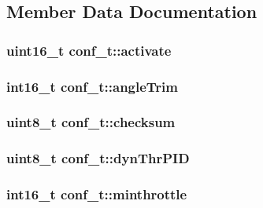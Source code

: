 \subsection{Member Data Documentation}
\hypertarget{structconf__t_a1442ab81807251b8fe263a6facf11ddb}{
\subsubsection[{activate}]{\setlength{\rightskip}{0pt plus 5cm}uint16\-\_\-t conf\-\_\-t\-::activate}}\label{structconf__t_a1442ab81807251b8fe263a6facf11ddb}
\hypertarget{structconf__t_ab122cdccc1b9b801849f925be1680054}{
\subsubsection[{angle\-Trim}]{\setlength{\rightskip}{0pt plus 5cm}int16\-\_\-t conf\-\_\-t\-::angle\-Trim}}\label{structconf__t_ab122cdccc1b9b801849f925be1680054}
\hypertarget{structconf__t_a9d2871d7decd958de75b19a372955045}{
\subsubsection[{checksum}]{\setlength{\rightskip}{0pt plus 5cm}uint8\-\_\-t conf\-\_\-t\-::checksum}}\label{structconf__t_a9d2871d7decd958de75b19a372955045}
\hypertarget{structconf__t_a47cb9553b60e167b09e7665b146c28db}{
\subsubsection[{dyn\-Thr\-P\-I\-D}]{\setlength{\rightskip}{0pt plus 5cm}uint8\-\_\-t conf\-\_\-t\-::dyn\-Thr\-P\-I\-D}}\label{structconf__t_a47cb9553b60e167b09e7665b146c28db}
\hypertarget{structconf__t_a38afc04bc65eb117eb45c9bc0c46d3c5}{
\subsubsection[{minthrottle}]{\setlength{\rightskip}{0pt plus 5cm}int16\-\_\-t conf\-\_\-t\-::minthrottle}}\label{structconf__t_a38afc04bc65eb117eb45c9bc0c46d3c5}
